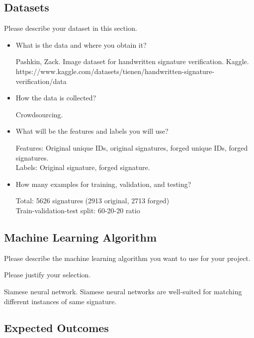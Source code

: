 \documentclass[11pt]{article}
\begin{document}
\subsection{Datasets}

Please describe your dataset in this section.

\begin{itemize}
  \item What is the data and where you obtain it?
  \begin{itemize}
      Pashkin, Zack. Image dataset for handwritten signature verification. Kaggle.\\
      https://www.kaggle.com/datasets/tienen/handwritten-signature-verification/data
  \end{itemize}
  \item How the data is collected?
  \begin{itemize}
      Crowdsourcing.
  \end{itemize}
  \item What will be the features and labels you will use?
  \begin{itemize}
      Features: Original unique IDs, original signatures, forged unique IDs, forged signatures.\\
      Labels: Original signature, forged signature.
  \end{itemize}
  \item How many examples for training, validation, and testing?
  \begin{itemize}
      Total: 5626 signatures (2913 original, 2713 forged)\\
      Train-validation-test split: 60-20-20 ratio
  \end{itemize}
\end{itemize}

\subsection{Machine Learning Algorithm}

Please describe the machine learning algorithm you want to use
for your project.

\noindent Please justify your selection.
    \begin{itemize}
        Siamese neural network. Siamese neural networks are well-suited for matching different instances of same signature.
  \end{itemize}
\subsection{Expected Outcomes}
\end{document}
